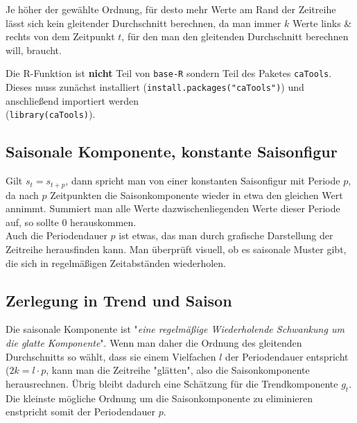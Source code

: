 \documentclass[a4paper]{article}
\newcommand\dangersign[1][2ex]{%
  \renewcommand\stacktype{L}%
  \scaleto{\stackon[1.3pt]{\color{red}$\triangle$}{\tiny !}}{#1}%
}
\begin{document}
\noindent \dangersign[3ex] Je höher der gewählte Ordnung, für desto mehr Werte am Rand der Zeitreihe lässt sich kein gleitender Durchschnitt berechnen, da man immer $k$ Werte links \& rechts von dem Zeitpunkt $t$, für den man den gleitenden Durchschnitt berechnen will, braucht.\\

\noindent {}

\noindent \dangersign[3ex] Die R-Funktion ist \textbf{nicht} Teil von \texttt{base-R} sondern Teil des Paketes \texttt{caTools}. Dieses muss zunächst installiert (\texttt{install.packages("caTools")}) und anschließend importiert werden\\(\texttt{library(caTools)}).


\subsection{Saisonale Komponente, konstante Saisonfigur}
Gilt $s_t = s_{t+p}$, dann spricht man von einer konstanten Saisonfigur mit Periode $p$, da nach $p$ Zeitpunkten die Saisonkomponente wieder in etwa den gleichen Wert annimmt. Summiert man alle Werte dazwischenliegenden Werte dieser Periode auf, so sollte 0 herauskommen.\\

\noindent \dangersign[3ex] Auch die Periodendauer $p$ ist etwas, das man durch grafische Darstellung der Zeitreihe herausfinden kann. Man überprüft visuell, ob es saisonale Muster gibt, die sich in regelmäßigen Zeitabständen wiederholen.

\subsection{Zerlegung in Trend und Saison}
Die saisonale Komponente ist "\textit{eine regelmäßige Wiederholende Schwankung um die glatte Komponente}". Wenn man daher die Ordnung des gleitenden Durchschnitts so wählt, dass sie einem Vielfachen $l$ der Periodendauer entspricht ($2k = l \cdotp p$, kann man die Zeitreihe "glätten", also die Saisonkomponente herausrechnen. Übrig bleibt dadurch eine Schätzung für die Trendkomponente $g_t$.
Die kleinste mögliche Ordnung um die Saisonkomponente zu eliminieren enstpricht somit der Periodendauer $p$.\\
\end{document}
